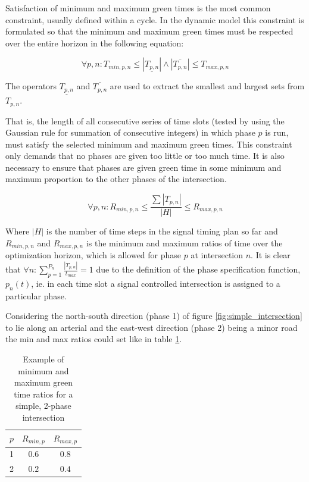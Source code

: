 Satisfaction of minimum and maximum green times is the most common constraint, usually defined within a cycle. In the dynamic model this constraint is formulated so that the minimum and maximum green times must be respected over the entire horizon in the following equation:

\begin{equation}
\label{eqn:minmaxtimes}
\forall p,n : T_{min,p,n} \leq |\underline{T_{p,n}}| \wedge |\overline{T_{p,n}}| \leq T_{max,p,n} 
\end{equation}

The operators $\underline{T_{p,n}}$ and $\overline{T_{p,n}}$ are used to extract the smallest and largest sets from $T_{p,n}$.

That is, the length of all consecutive series of time slots (tested by using the Gaussian rule for summation of consecutive integers) in which phase $p$ is run, must satisfy the selected minimum and maximum green times. This constraint only demands that no phases are given too little or too much time. It is also necessary to ensure that phases are given green time in some minimum and maximum proportion to the other phases of the intersection.

\begin{equation}
\label{eqn:proportions}
\forall p,n : R_{min,p,n} \leq \frac{\sum |T_{p,n}|}{|H|} \leq R_{max,p,n}
\end{equation}

Where $|H|$ is the number of time steps in the signal timing plan so far and $R_{min,p,n}$ and $R_{max,p,n}$ is the minimum and maximum ratios of time over the optimization horizon, which is allowed for phase $p$ at intersection $n$. It is clear that $\forall n : \displaystyle\sum_{p=1}^{P_n}\frac{|T_{p,n}|}{t_{max}} = 1$ due to the definition of the phase specification function, $p_n(t)$,  ie. in each time slot a signal controlled intersection is assigned to a particular phase.

Considering the north-south direction (phase 1) of figure \ref{fig:simple_intersection} to lie along an arterial and the east-west direction (phase 2) being a minor road the min and max ratios could set like in table \ref{tbl:minmaxratios}.

\begin{table}[!ht]
\begin{center}
\begin{tabular}{c|c|c}
$p$ & $R_{min,p}$ & $R_{max,p}$ \\ \hline
1 & $0.6$ & $0.8$ \\ 
2 & $0.2$ & $0.4$
\end{tabular}
\end{center}
\caption{Example of minimum and maximum green time ratios for a simple, 2-phase intersection}
\label{tbl:minmaxratios}
\end{table}

